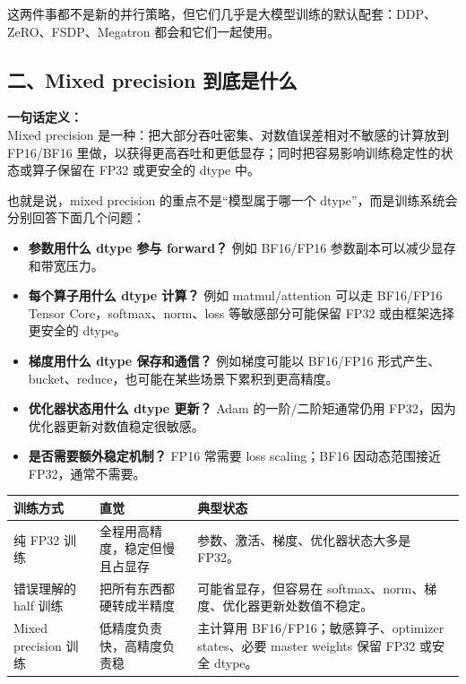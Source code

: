 这两件事都不是新的并行策略，但它们几乎是大模型训练的默认配套：DDP、ZeRO、FSDP、Megatron 都会和它们一起使用。

\subsection{二、Mixed precision 到底是什么}

\begin{summarybox}
\textbf{一句话定义：}\\
Mixed precision 是一种：把大部分吞吐密集、对数值误差相对不敏感的计算放到 FP16/BF16 里做，以获得更高吞吐和更低显存；同时把容易影响训练稳定性的状态或算子保留在 FP32 或更安全的 dtype 中。
\end{summarybox}

也就是说，mixed precision 的重点不是“模型属于哪一个 dtype”，而是训练系统会分别回答下面几个问题：

\begin{itemize}[leftmargin=1.5em]
  \item \textbf{参数用什么 dtype 参与 forward？} 例如 BF16/FP16 参数副本可以减少显存和带宽压力。
  \item \textbf{每个算子用什么 dtype 计算？} 例如 matmul/attention 可以走 BF16/FP16 Tensor Core，softmax、norm、loss 等敏感部分可能保留 FP32 或由框架选择更安全的 dtype。
  \item \textbf{梯度用什么 dtype 保存和通信？} 例如梯度可能以 BF16/FP16 形式产生、bucket、reduce，也可能在某些场景下累积到更高精度。
  \item \textbf{优化器状态用什么 dtype 更新？} Adam 的一阶/二阶矩通常仍用 FP32，因为优化器更新对数值稳定很敏感。
  \item \textbf{是否需要额外稳定机制？} FP16 常需要 loss scaling；BF16 因动态范围接近 FP32，通常不需要。
\end{itemize}

\begin{center}
{\small
\begin{tabular}{p{3.2cm}p{4.3cm}p{5cm}}
\hline
\textbf{训练方式} & \textbf{直觉} & \textbf{典型状态} \\
\hline
纯 FP32 训练 & 全程用高精度，稳定但慢且占显存 & 参数、激活、梯度、优化器状态大多是 FP32。 \\
错误理解的 half 训练 & 把所有东西都硬转成半精度 & 可能省显存，但容易在 softmax、norm、梯度、优化器更新处数值不稳定。 \\
Mixed precision 训练 & 低精度负责快，高精度负责稳 & 主计算用 BF16/FP16；敏感算子、optimizer states、必要 master weights 保留 FP32 或安全 dtype。 \\
\hline
\end{tabular}
}
\end{center}

